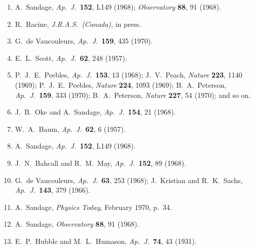 \begin{enumerate}
  \item{}\label{ch14-ref-34}
  A.~Sandage, \emph{Ap.\ J.}\ \textbf{152}, L149 (1968);
  \emph{Observatory} \textbf{88}, 91 (1968).

  \item{}\label{ch14-ref-35}
  R.~Racine, \emph{J.R.A.S.\ (Canada)}, in press.

  \item{}\label{ch14-ref-36}
  G.~de Vaucouleurs, \emph{Ap.\ J.}\ \textbf{159}, 435 (1970).

  \item{}\label{ch14-ref-37}
  E.~L.~Scott, \emph{Ap.\ J.}\ \textbf{62}, 248 (1957).

  \item{}\label{ch14-ref-38}
  P.~J.~E.~Peebles, \emph{Ap.\ J.}\ \textbf{153}, 13 (1968);
  J.~V.~Peach, \emph{Nature} \textbf{223}, 1140 (1969);
  P.~J.~E.~Peebles, \emph{Nature} \textbf{224}, 1093 (1969);
  B.~A.~Peterson, \emph{Ap.\ J.}\ \textbf{159}, 333 (1970);
  B.~A.~Peterson, \emph{Nature} \textbf{227}, 54 (1970); and so on.

  \item{}\label{ch14-ref-39}
  J.~B.~Oke and A.~Sandage, \emph{Ap.\ J.}\ \textbf{154}, 21 (1968).

  \item{}\label{ch14-ref-40}
  W.~A.~Baum, \emph{Ap.\ J.}\ \textbf{62}, 6 (1957).

  \item{}\label{ch14-ref-41}
  A.~Sandage, \emph{Ap.\ J.}\ \textbf{152}, L149 (1968).

  \item{}\label{ch14-ref-42}
  J.~N.~Bahcall and R.~M.~May, \emph{Ap.\ J.}\ \textbf{152}, 89 (1968).

  \item{}\label{ch14-ref-43}
  G.~de Vaucouleurs, \emph{Ap.\ J.}\ \textbf{63}, 253 (1968);
  J.~Kristian and R.~K.~Sachs,
  \emph{Ap.\ J.}\ \textbf{143}, 379 (1966).

  \item{}\label{ch14-ref-44}
  A.~Sandage, \emph{Physics Today}, February 1970, p.~34.

  \item{}\label{ch14-ref-45}
  A.~Sandage, \emph{Observatory} \textbf{88}, 91 (1968).

  \item{}\label{ch14-ref-46}
  E.~P.~Hubble and M.~L.~Humason,
  \emph{Ap.\ J.}\ \textbf{74}, 43 (1931).


\end{enumerate}
